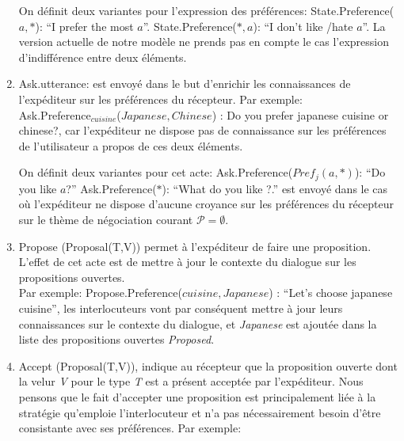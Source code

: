 \documentclass[a4paper,french]{article}
\begin{document}
\begin{enumerate}
		\par On définit deux variantes pour l'expression des préférences: 
		\subitem State.Preference(\textit{$a, *$}): ``I prefer the most $a$''.
		\subitem State.Preference(\textit{$*, a$}): ``I don't like /hate $a$''.
		\subitem La version actuelle de notre modèle ne prends pas en compte le cas l'expression d'indifférence entre deux éléments.%
		\\
		\item Ask.utterance: est envoyé dans le but d'enrichir les connaissances de l'expéditeur sur les préférences du récepteur. Par exemple: \\ Ask.Preference$_{cuisine}$(\textit{$Japanese , Chinese$}) : Do you prefer japanese cuisine or chinese?, car l'expéditeur ne dispose pas de connaissance sur les préférences de l'utilisateur a propos de ces deux éléments.
		\par On définit deux variantes pour cet acte: 
		\subitem Ask.Preference(\textit{$Pref_{j}(a, *)$}): ``Do you like $a$?''
		\subitem Ask.Preference(\textit{$*$}): ``What do you like ?.'' est envoyé dans le cas où l'expéditeur ne dispose d'aucune croyance sur les préférences du récepteur sur le thème de négociation courant $\mathcal{P}= \emptyset$. 
		\\
		\item Propose (Proposal(T,V)) permet à l'expéditeur de faire une proposition. L'effet de cet acte est de mettre à jour le contexte du dialogue sur les propositions ouvertes.
		\\ Par exemple: Propose.Preference(\textit{$cuisine,Japanese$}) : ``Let's choose japanese cuisine'', les interlocuteurs vont par conséquent mettre à jour leurs connaissances sur le contexte du dialogue, et \textit{Japanese} est ajoutée dans la liste des propositions ouvertes \textit{Proposed}.
		\\
		\item Accept (Proposal(T,V)), indique au récepteur que la proposition ouverte dont la velur \textit{V} pour le type \textit{T} est a présent acceptée par l'expéditeur.  Nous pensons que le fait d'accepter une proposition est principalement liée à la stratégie qu'emploie l'interlocuteur et n'a pas nécessairement besoin d'être consistante avec ses préférences. Par exemple: 
		

\end{enumerate}
\end{document}

